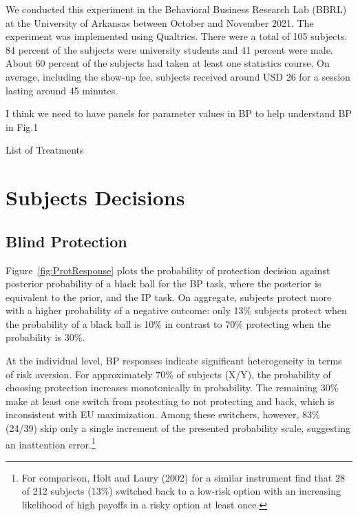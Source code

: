 \documentclass[12pt,a4paper]{article}
\newcommand{\pmt}[1]{{\color{Blue}#1}}
\begin{document}
We conducted this experiment in the Behavioral Business Research Lab (BBRL) at the University of Arkansas between October and November 2021.  The experiment was implemented using Qualtrics. There were a total of 105 subjects. 84 percent of the subjects were university students and 41 percent were male.  About 60 percent of the subjects had taken at least one statistics course. On average, including the show-up fee, subjects received around USD 26 for a session lasting around 45 minutes.  



\pmt{I think we need to have panels for parameter values in BP to help understand BP in Fig.1}
\begin{table}[h!]
\caption{List of Treatments} \label{tab:treatments}

\end{table}


\vspace{20pt}
\section{Subjects Decisions}\label{sec:sanity}

\subsection{Blind Protection}

Figure~\ref{fig:ProtResponse} plots the probability of protection decision against posterior probability of a black ball for the BP task, where the posterior is equivalent to the prior, and the IP task. On aggregate, subjects protect more with a higher probability of a negative outcome: only 13\% subjects protect when the probability of a black ball is 10\% in contrast to 70\% protecting when the probability is 30\%. 

At the individual level, BP responses indicate significant heterogeneity in terms of risk aversion. For approximately 70\% of subjects (X/Y), the probability of choosing protection increases monotonically in probability. The remaining 30\% make at least one switch from protecting to not protecting and back, which is inconsistent with EU maximization. Among these switchers, however, 83\% (24/39) skip only a single increment of the presented probability scale, suggesting an inattention error.\footnote{For comparison, Holt and Laury (2002) for a similar instrument find that 28 of 212 subjects (13\%) switched back to a low-risk option with an increasing likelihood of high payoffs in a risky option at least once.} 
\end{document}
